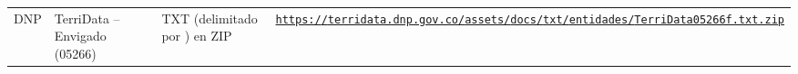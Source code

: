 \documentclass[11pt,letterpaper]{article}
\begin{document}
{\begin{xltabular}{\linewidth}{L{2.8cm}YL{1.6cm}Y}
DNP & TerriData -- Envigado (05266) & TXT (delimitado por \textbar{}) en ZIP & \texttt{\footnotesize \href{https://terridata.dnp.gov.co/assets/docs/txt/entidades/TerriData05266f.txt.zip}{https:/\allowbreak{}}\allowbreak{}\href{https://terridata.dnp.gov.co/assets/docs/txt/entidades/TerriData05266f.txt.zip}{/\allowbreak{}}\allowbreak{}\href{https://terridata.dnp.gov.co/assets/docs/txt/entidades/TerriData05266f.txt.zip}{terridata.\allowbreak{}dnp.\allowbreak{}gov.\allowbreak{}co/\allowbreak{}}\allowbreak{}\href{https://terridata.dnp.gov.co/assets/docs/txt/entidades/TerriData05266f.txt.zip}{assets/\allowbreak{}}\allowbreak{}\href{https://terridata.dnp.gov.co/assets/docs/txt/entidades/TerriData05266f.txt.zip}{docs/\allowbreak{}}\allowbreak{}\href{https://terridata.dnp.gov.co/assets/docs/txt/entidades/TerriData05266f.txt.zip}{txt/\allowbreak{}}\allowbreak{}\href{https://terridata.dnp.gov.co/assets/docs/txt/entidades/TerriData05266f.txt.zip}{entidades/\allowbreak{}}\allowbreak{}\href{https://terridata.dnp.gov.co/assets/docs/txt/entidades/TerriData05266f.txt.zip}{TerriData05266f.\allowbreak{}txt.\allowbreak{}zip}} \\

\end{xltabular}}
\end{document}
